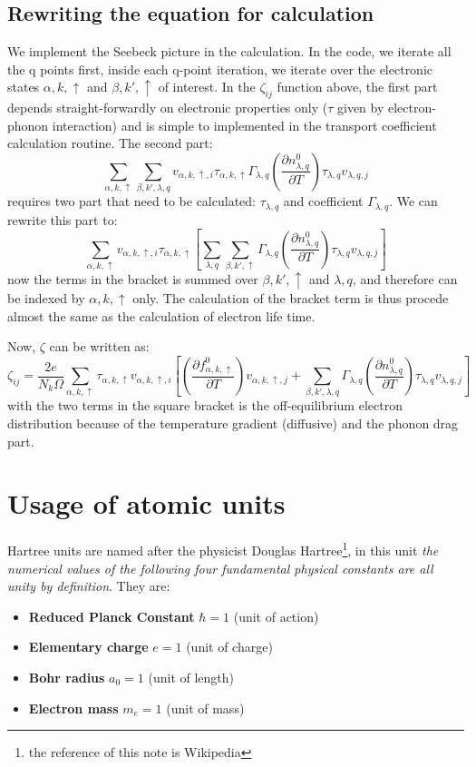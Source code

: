 \documentclass{article}
\newcommand{\pfrac}[2]{\frac{\partial #1}{\partial #2}}
\newcommand{\fak}{f_{\alpha,k,\uparrow}}
\newcommand{\nlq}{n_{\lambda,q}}
\newcommand{\ak}{\alpha,k,\uparrow}
\newcommand{\bk}{\beta,k',\uparrow}
\newcommand{\ql}{\lambda,q}
\begin{document}
\subsection*{Rewriting the equation for calculation }
We implement the Seebeck picture in the calculation. In the code, we iterate 
all the q points first, inside each q-point iteration, we iterate over the 
electronic states $\ak$ and $\bk$ of interest. In the $\zeta_{ij}$ function above,
the first part depends straight-forwardly on electronic properties only ($\tau$ given by 
electron-phonon interaction) and is simple to implemented in the transport coefficient 
calculation routine. The second part:
\begin{equation}
    \sum_{\ak}\sum_{\beta, k',\lambda, q} v_{\ak,i} \tau_{\ak} 
            \varGamma_{\lambda,q} \left( \pfrac{\nlq^0}{T} \right) \tau_{\ql} v_{\ql,j}
\end{equation}
requires two part that need to be calculated: $\tau_{\ql}$ and coefficient $\varGamma_{\ql}$. 
We can rewrite this part to:
\begin{equation}
    \sum_{\ak} v_{\ak,i} \tau_{\ak} \left[ \sum_{\ql} \sum_{\bk}  
            \varGamma_{\lambda,q} \left( \pfrac{\nlq^0}{T} \right) \tau_{\ql} v_{\ql,j} \right]
\end{equation}
now the terms in the bracket is summed over $\bk$ and $\ql$, and therefore can be indexed by $\ak$ only. 
The calculation of the bracket term is thus procede almost the same as the calculation of electron life time.

Now, $\zeta$ can be written as:
\begin{equation}
    \zeta_{ij} = \frac{2e}{N_k \Omega} \sum_{\ak}\tau_{\ak}v_{\ak,i} \left[ \left( \pfrac{\fak^0}{T} \right) v_{\ak,j} 
                        + \sum_{\beta, k',\lambda, q}  \varGamma_{\lambda,q} \left( \pfrac{\nlq^0}{T} \right) \tau_{\ql} v_{\ql,j} \right]
\end{equation}
with the two terms in the square bracket is the off-equilibrium electron distribution because of the temperature gradient (diffusive)
and the phonon drag part.

\newpage

\section*{ Usage of atomic units}
Hartree units are named after the physicist Douglas Hartree\footnote{the reference of this note is Wikipedia}, 
in this unit
\emph{the numerical values of the following four fundamental physical constants 
are all unity by definition}. They are:
\begin{itemize}
    \item \textbf{Reduced Planck Constant} $\hbar=1$ (unit of action)
    \item \textbf{Elementary charge} $e=1$ (unit of charge)
    \item \textbf{Bohr radius} $a_0=1$ (unit of length)
    \item \textbf{Electron mass} $m_e=1$ (unit of mass)
\end{itemize}
\end{document}
